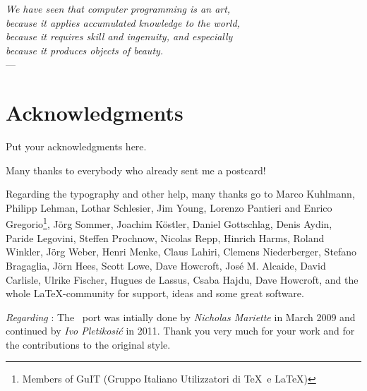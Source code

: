 \documentclass[../thesis.tex]{subfiles}
\begin{document}

\begin{flushright}{\slshape
    We have seen that computer programming is an art, \\
    because it applies accumulated knowledge to the world, \\
    because it requires skill and ingenuity, and especially \\
    because it produces objects of beauty.} \\ \medskip
    ---  \citep{knuth:1974}
\end{flushright}



\bigskip

\begingroup
\let\clearpage\relax
\let\cleardoublepage\relax
\let\cleardoublepage\relax
\chapter*{Acknowledgments}
Put your acknowledgments here.

Many thanks to everybody who already sent me a postcard!

Regarding the typography and other help, many thanks go to Marco
Kuhlmann, Philipp Lehman, Lothar Schlesier, Jim Young, Lorenzo
Pantieri and Enrico Gregorio\footnote{Members of GuIT (Gruppo
Italiano Utilizzatori di \TeX\ e \LaTeX )}, J\"org Sommer,
Joachim K\"ostler, Daniel Gottschlag, Denis Aydin, Paride
Legovini, Steffen Prochnow, Nicolas Repp, Hinrich Harms,
Roland Winkler, Jörg Weber, Henri Menke, Claus Lahiri,
Clemens Niederberger, Stefano Bragaglia, Jörn Hees,
Scott Lowe, Dave Howcroft, Jos\'e M. Alcaide, David Carlisle,
Ulrike Fischer, Hugues de Lassus, Csaba Hajdu, Dave Howcroft, 
and the whole \LaTeX-community for support, ideas and
some great software.

\bigskip

\noindent\emph{Regarding \mLyX}: The \mLyX\ port was intially done by
\emph{Nicholas Mariette} in March 2009 and continued by
\emph{Ivo Pletikosi\'c} in 2011. Thank you very much for your
work and for the contributions to the original style.


\endgroup
\end{document}
